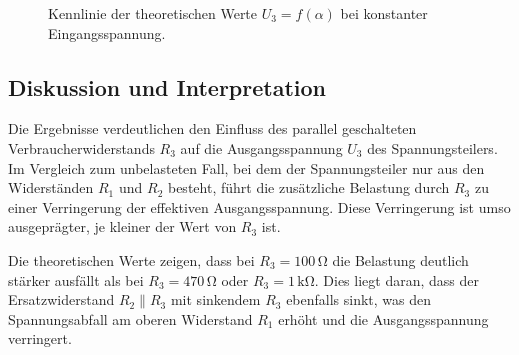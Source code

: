\begin{figure}[H]
\centering
{}
\caption{Kennlinie der theoretischen Werte $U_3 = f(\alpha)$ bei konstanter Eingangsspannung.}
\label{fig:K5A4}
\end{figure}


\subsection{Diskussion und Interpretation}
Die Ergebnisse verdeutlichen den Einfluss des parallel geschalteten Verbraucherwiderstands $R_3$ auf die Ausgangsspannung $U_3$ des Spannungsteilers. Im Vergleich zum unbelasteten Fall, bei dem der Spannungsteiler nur aus den Widerständen $R_1$ und $R_2$ besteht, führt die zusätzliche Belastung durch $R_3$ zu einer Verringerung der effektiven Ausgangsspannung. Diese Verringerung ist umso ausgeprägter, je kleiner der Wert von $R_3$ ist. 

Die theoretischen Werte zeigen, dass bei \(R_3 = 100\,\unit{\ohm}\) die Belastung deutlich stärker ausfällt als bei \(R_3 = 470\,\unit{\ohm}\) oder \(R_3 = 1\,\unit{\kohm}\). Dies liegt daran, dass der Ersatzwiderstand $R_2 \parallel R_3$ mit sinkendem $R_3$ ebenfalls sinkt, was den Spannungsabfall am oberen Widerstand $R_1$ erhöht und die Ausgangsspannung verringert.

